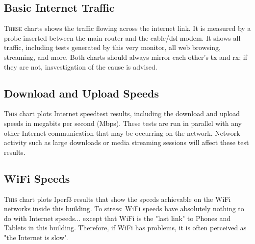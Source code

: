 \documentclass[letterpaper,12pt]{article}
\begin{document}
\newpage
\begin{landscape}
\section{Basic Internet Traffic}
\lettrine{T}{hese}
charts shows the traffic flowing across the internet link.  It is measured by a probe inserted between the main router and the cable/dsl modem.  It shows all traffic, including tests generated by this very monitor, all web browsing, streaming, and more. Both charts should always mirror each other's tx and rx; if they are not,
insvestigation of the cause is advised. 
\begin{center}
\label{visina8}%
\end{center}
\end{landscape}

\newpage
\begin{landscape}
\section{Download and Upload Speeds}

\lettrine{T}{his}
chart plots Internet speedtest results, including the download and upload speeds in megabits per second (Mbps). These tests are run in parallel with any other Internet communication that may be occurring on the network. Network activity such as large downloads or media streaming sessions will affect these test results.
\begin{center}
\label{visina8}%
\end{center}
\end{landscape}


\newpage
\begin{landscape}
\section{WiFi Speeds}

\lettrine{T}{his}
chart plots Iperf3 results that show the speeds achievable on the WiFi networks inside this building.  To stress: WiFi speeds have absolutely nothing to do with Internet speeds... except that WiFi is the "last link" to Phones and Tablets in this building.  Therefore, if WiFi has problems, it is often perceived as "the Internet is slow".  
\begin{center}
\label{visina8}%
\label{visina8}%
\end{center}
\end{landscape}
\end{document}
